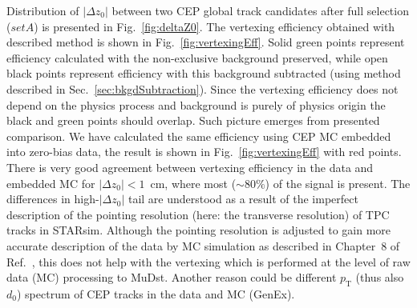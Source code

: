 Distribution of $|\Delta z_{0}|$ between two CEP global track candidates after full selection ($set A$) is presented in Fig.~\ref{fig:deltaZ0}. The vertexing efficiency obtained with described method is shown in Fig.~\ref{fig:vertexingEff}. Solid green points represent efficiency calculated with the non-exclusive background preserved, while open black points represent efficiency with this background subtracted (using method described in Sec.~\ref{sec:bkgdSubtraction}). Since the vertexing efficiency does not depend on the physics process and background is purely of physics origin the black and green points should overlap. Such picture emerges from presented comparison. We have calculated the same efficiency using CEP MC embedded into zero-bias data, the result is shown in Fig.~\ref{fig:vertexingEff} with red points. There is very good agreement between vertexing efficiency in the data and embedded MC for $|\Delta z_{0}|<1$~cm, where most ($\sim80\%$) of the signal is present. The differences in high-$|\Delta z_{0}|$ tail are understood as a result of the imperfect description of the pointing resolution (here: the transverse resolution) of TPC tracks in STARsim. Although the pointing resolution is adjusted to gain more accurate description of the data by MC simulation as described in Chapter~8 of Ref.~\cite{supplementaryNote}, this does not help with the vertexing which is performed at the level of raw data (MC) processing to MuDst. Another reason could be different $p_{\text{T}}$ (thus also $d_{0}$) spectrum of CEP tracks in the data and MC (GenEx).

